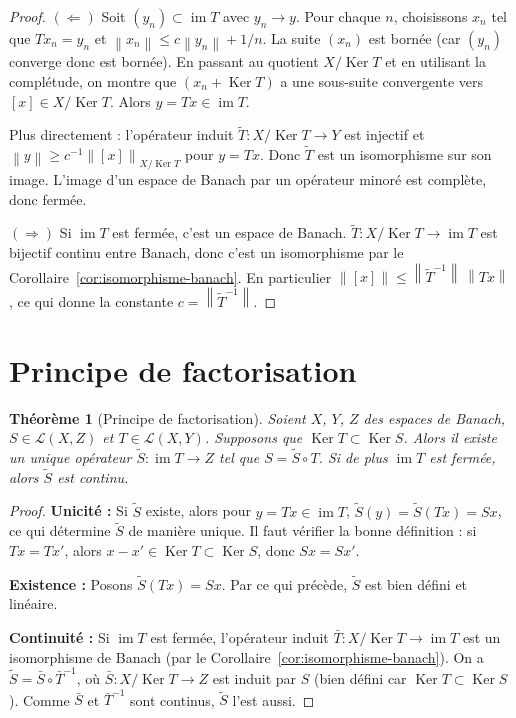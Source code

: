 \documentclass[a4paper,12pt]{book}
\DeclareMathOperator{\im}{im}
\DeclareMathOperator{\Ker}{Ker}
\newcommand{\norm}[1]{\left\| #1 \right\|}
\theoremstyle{definition}
\theoremstyle{plain}
\newtheorem{theoreme}[definition]{Théorème}
\theoremstyle{remark}
\begin{document}
\begin{proof}
$(\Leftarrow)$ Soit $(y_n) \subset \im T$ avec $y_n \to y$. Pour chaque $n$,
choisissons $x_n$ tel que $Tx_n = y_n$ et $\norm{x_n} \leq c\norm{y_n} + 1/n$.
La suite $(x_n)$ est bornée (car $(y_n)$ converge donc est bornée). En passant
au quotient $X/\Ker T$ et en utilisant la complétude, on montre que $(x_n + \Ker T)$
a une sous-suite convergente vers $[x] \in X/\Ker T$. Alors $y = Tx \in \im T$.

Plus directement : l'opérateur induit $\tilde{T} : X/\Ker T \to Y$ est
injectif et $\norm{y} \geq c^{-1}\norm{[x]}_{X/\Ker T}$ pour $y = Tx$.
Donc $\tilde{T}$ est un isomorphisme sur son image. L'image d'un espace de Banach
par un opérateur minoré est complète, donc fermée.

$(\Rightarrow)$ Si $\im T$ est fermée, c'est un espace de Banach.
$\tilde{T} : X/\Ker T \to \im T$ est bijectif continu entre Banach,
donc c'est un isomorphisme par le Corollaire~\ref{cor:isomorphisme-banach}.
En particulier $\norm{[x]} \leq \norm{\tilde{T}^{-1}}\,\norm{Tx}$, ce qui donne
la constante $c = \norm{\tilde{T}^{-1}}$.
\end{proof}


\section{Principe de factorisation}
\label{sec:factorisation}


\begin{theoreme}[Principe de factorisation]
\label{thm:factorisation}
Soient $X$, $Y$, $Z$ des espaces de Banach, $S \in \mathcal{L}(X,Z)$ et
$T \in \mathcal{L}(X,Y)$. Supposons que $\Ker T \subset \Ker S$.
Alors il existe un unique opérateur $\tilde{S} : \im T \to Z$ tel que
$S = \tilde{S} \circ T$. Si de plus $\im T$ est fermée, alors
$\tilde{S}$ est continu.
\end{theoreme}

\begin{proof}
\textbf{Unicité :} Si $\tilde{S}$ existe, alors pour $y = Tx \in \im T$,
$\tilde{S}(y) = \tilde{S}(Tx) = Sx$, ce qui détermine $\tilde{S}$ de manière unique.
Il faut vérifier la bonne définition : si $Tx = Tx'$, alors $x - x' \in \Ker T \subset \Ker S$,
donc $Sx = Sx'$.

\textbf{Existence :} Posons $\tilde{S}(Tx) = Sx$. Par ce qui précède,
$\tilde{S}$ est bien défini et linéaire.

\textbf{Continuité :} Si $\im T$ est fermée, l'opérateur induit
$\bar{T} : X/\Ker T \to \im T$ est un isomorphisme de Banach
(par le Corollaire~\ref{cor:isomorphisme-banach}). On a
$\tilde{S} = \bar{S} \circ \bar{T}^{-1}$, où $\bar{S} : X/\Ker T \to Z$
est induit par $S$ (bien défini car $\Ker T \subset \Ker S$). Comme
$\bar{S}$ et $\bar{T}^{-1}$ sont continus, $\tilde{S}$ l'est aussi.
\end{proof}
\end{document}
